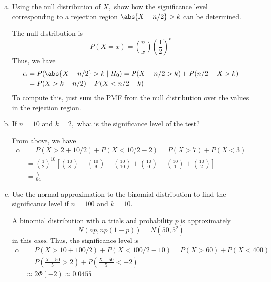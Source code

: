 \documentclass{article}
\begin{document}
\begin{itemize}
\begin{enumerate}[a.]
\begin{proof}
				\end{proof}

			\item Using the null distribution of $X,$ show how the significance level corresponding to a rejection region $\abs{X-n/2}>k$ can be determined.
				\begin{soln}
					The null distribution is \[P(X=x)=\binom{n}{x} \left( \frac{1}{2} \right)^n\] Thus, we have
					\begin{align*}
						\alpha &= P(\abs{X-n/2}>k\mid H_0) = P(X-n/2>k) + P(n/2-X > k) \\
						&= P(X > k+n/2) + P(X < n/2 - k)
					\end{align*}
					To compute this, just sum the PMF from the null distribution over the values in the rejection region.
					
				\end{soln}

			\item If $n=10$ and $k=2,$ what is the significance level of the test?
				\begin{soln}
					From above, we have
					\begin{align*}
						\alpha &= P(X>2+10/2) + P(X<10/2-2)= P(X > 7) + P(X < 3) \\
						&= \left(\frac{1}{2}\right)^{10}\left[ \binom{10}{8}+\binom{10}{9}+\binom{10}{10} + \binom{10}{0}+\binom{10}{1}+\binom{10}{2} \right] \\
						&= \frac{7}{64}
					\end{align*}
				\end{soln}

			\item Use the normal approximation to the binomial distribution to find the significance level if $n=100$ and $k=10.$
				\begin{soln}
					A binomial distribution with $n$ trials and probability $p$ is approximately \[N\left( np, np(1-p) \right) = N\left( 50, 5^2 \right)\] in this case. Thus, the significance level is
					\begin{align*}
						\alpha &= P(X > 10+100/2) + P(X<100/2 - 10) = P(X > 60) + P(X < 400) \\
						&= P\left( \frac{X-50}{5} > 2 \right) + P\left( \frac{X-50}{5} < -2 \right) \\
						&\approx 2\Phi(-2) \approx 0.0455
					\end{align*}
				\end{soln}
				
		\end{enumerate}


\end{itemize}
\end{document}
